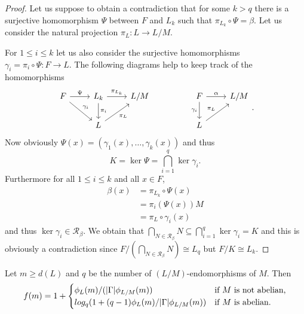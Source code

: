 \begin{proof}
    Let us suppose to obtain a contradiction that for some $k > q$ there is a surjective homomorphism $\Psi$ between $F$ and $L_k$ such that $\pi_{L_k} \circ \Psi = \beta$. 
    Let us consider the natural projection $\pi_L \colon L \rightarrow L/M$.

    For $1 \le i \le k$ let us also consider the surjective homomorphisms $\gamma_i = \pi_i \circ \Psi \colon F \rightarrow L$.
    The following diagrams help to keep track of the homomorphisms
    $$
\begin{tikzcd}
    F \arrow[r, "\Psi"] \arrow[rd, "\gamma_i"] & L_k \arrow[d, "\pi_i"] \arrow[r, "\pi_{L_k}"] & L/M &  & F \arrow[r, "\alpha"] \arrow[d, "\gamma_i"'] & L/M \\
                                               & L \arrow[ru, "\pi_L"']                        &     &  & L \arrow[ru, "\pi_L"]                        &    
    \end{tikzcd}.
    $$
    Now obviously $\Psi(x) = (\gamma_1(x), \ldots , \gamma_k(x))$ and thus
    $$K = \ker \Psi = \bigcap_{i=1}^{q} \ker \gamma_i.$$
    Furthermore for all $1 \le i \le k$ and all $x \in F$,
    \begin{align*}
        \beta(x) &= \pi_{L_k} \circ \Psi(x) \\
                  &= \pi_i(\Psi(x))M \\
                  &= \pi_L \circ \gamma_i(x) 
    \end{align*}
   and thus $\ker \gamma_i \in \mathscr{R}_\beta$.
   We obtain that $\bigcap_{N \in \mathscr{R}_\beta}N \subseteq \bigcap_{i=1}^{q} \ker \gamma_i = K$ 
   and this is obviously a contradiction since 
    $F/(\bigcap_{N \in \mathscr{R}_\beta}N) \cong L_q$ but $F/K \cong L_k$. 

\end{proof}

\begin{theorem}
    Let $m \ge d(L)$ and $q$ be the number of $(L/M)$-endomorphisms of $M$. Then 
    $$
    f(m) = 1 +
    \begin{cases}
        \phi_L(m)/(| \Gamma |\phi_{L/M}(m)) & \text{if } M \text{ is not abelian,} \\
        log_q(1+(q-1)\phi_L(m)/| \Gamma |\phi_{L/M}(m)) & \text{if } M \text{ is abelian.} \\
    \end{cases}
    $$
\end{theorem}

